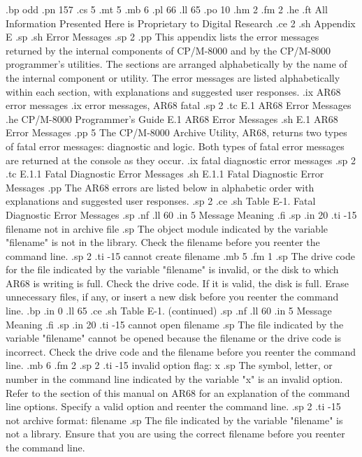 .bp odd
.pn 157
.cs 5
.mt 5
.mb 6
.pl 66
.ll 65
.po 10
.hm 2
.fm 2
.he
.ft All Information Presented Here is Proprietary to Digital Research
.ce 2
.sh
  Appendix E 
.sp
.sh
Error Messages
.sp 2
.pp
This appendix lists the error messages returned by the internal 
components of CP/M-8000 and by the CP/M-8000 programmer's utilities.
The sections are arranged alphabetically by the name of the 
internal component or utility.  The error messages are listed 
alphabetically within each section, with explanations and 
suggested user responses.
.ix AR68 error messages
.ix error messages, AR68 fatal
.sp 2
.tc    E.1  AR68 Error Messages
.he CP/M-8000 Programmer's Guide              E.1  AR68 Error Messages
.sh
E.1  AR68 Error Messages
.pp 5
The CP/M-8000 Archive Utility, AR68, returns two types of fatal error 
messages:  diagnostic and logic.  Both types of fatal error messages are 
returned at the console as they occur.
.ix fatal diagnostic error messages
.sp 2
.tc         E.1.1  Fatal Diagnostic Error Messages
.sh
E.1.1  Fatal Diagnostic Error Messages
.pp
The AR68 errors are listed below in alphabetic order with explanations 
and suggested user responses.
.sp 2
.ce
.sh
Table E-1.  Fatal Diagnostic Error Messages
.sp
.nf
.ll 60
.in 5
Message        Meaning
.fi
.sp
.in 20
.ti -15
filename not in archive file 
.sp
The object module indicated by the variable "filename" is not in 
the library.  Check the filename before you reenter the command line.  
.sp 2
.ti -15
cannot create filename
.mb 5
.fm 1
.sp
The drive code for the file indicated by the variable 
"filename" is invalid, or the disk to which AR68 is writing is full.  Check 
the drive code.  If it is valid, the disk 
is full.  Erase unnecessary files, if any, or insert a new disk before 
you reenter the command line.
.bp
.in 0
.ll 65
.ce
.sh
Table E-1.  (continued)
.sp
.nf
.ll 60
.in 5
Message        Meaning
.fi
.sp
.in 20
.ti -15
cannot open  filename
.sp
The file indicated by the variable "filename" cannot be opened 
because the filename or the drive code is incorrect.  Check the drive code 
and the filename before you reenter the command line.
.mb 6
.fm 2
.sp 2
.ti -15
invalid option flag:  x
.sp
The symbol, letter, or number in the command line indicated by the 
variable "x" is an invalid option.  Refer to the section of this manual on 
AR68 for an explanation of the command line options.  Specify a valid 
option and reenter the command line.
.sp 2
.ti -15
not archive format: filename
.sp
The file indicated by the variable "filename" is not a library.  Ensure that 
you are using the correct filename before you reenter the command line.

